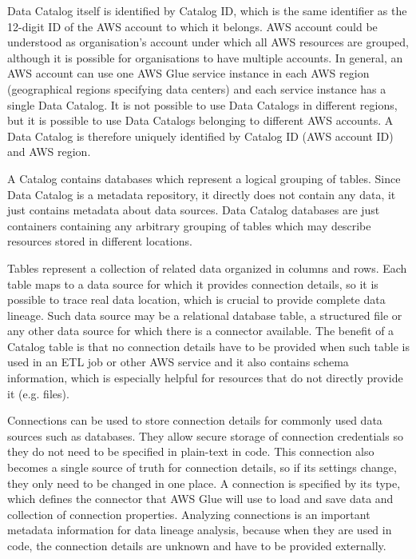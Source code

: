 \par
Data Catalog itself is identified by Catalog ID, which is the same identifier as the 12-digit ID of the AWS account to which it belongs. AWS account could be understood as organisation's account under which all AWS resources are grouped, although it is possible for organisations to have multiple accounts. In general, an AWS account can use one AWS Glue service instance in each AWS region (geographical regions specifying data centers) and each service instance has a single Data Catalog. It is not possible to use Data Catalogs in different regions, but it is possible to use Data Catalogs belonging to different AWS accounts. A Data Catalog is therefore uniquely identified by Catalog ID (AWS account ID) and AWS region.
\par
A Catalog contains databases which represent a logical grouping of tables. Since Data Catalog is a metadata repository, it directly does not contain any data, it just contains metadata about data sources. Data Catalog databases are just containers containing any arbitrary grouping of tables which may describe resources stored in different locations.
\par
Tables represent a collection of related data organized in columns and rows. Each table maps to a data source for which it provides connection details, so it is possible to trace real data location, which is crucial to provide complete data lineage. Such data source may be a relational database table, a structured file or any other data source for which there is a connector available. The benefit of a Catalog table is that no connection details have to be provided when such table is used in an ETL job or other AWS service and it also contains schema information, which is especially helpful for resources that do not directly provide it (e.g. files). 
\par
Connections can be used to store connection details for commonly used data sources such as databases. They allow secure storage of connection credentials so they do not need to be specified in plain-text in code. This connection also becomes a single source of truth for connection details, so if its settings change, they only need to be changed in one place. A connection is specified by its type, which defines the connector that AWS Glue will use to load and save data and collection of connection properties. Analyzing connections is an important metadata information for data lineage analysis, because when they are used in code, the connection details are unknown and have to be provided externally.

